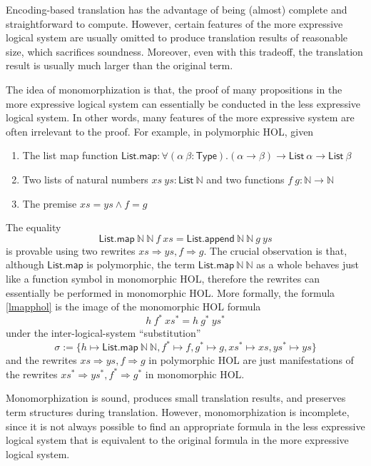   Encoding-based translation has the advantage of being (almost) complete
  and straightforward to compute. However, certain features of the more expressive
  logical system are usually omitted to produce translation results of reasonable size,
  which sacrifices soundness. Moreover, even with this tradeoff, the translation result is usually much larger
  than the original term.

  The idea of monomorphization is that, the proof of many propositions in the more expressive logical
  system can essentially be conducted in the less expressive logical system. In other words,
  many features of the more expressive system are often irrelevant to the proof. For example,
  in polymorphic HOL, given
  \begin{enumerate}
    \item The list map function $\mathsf{List.map} : \forall (\alpha \ \beta : \mathsf{Type}). (\alpha \to \beta) \to \mathsf{List} \ \alpha \to \mathsf{List} \ \beta$
    \item Two lists of natural numbers $xs \ ys : \mathsf{List} \ \mathbb{N}$ and two functions $f \ g : \mathbb{N} \to \mathbb{N}$
    \item The premise $xs = ys \land f = g$
  \end{enumerate}
  The equality
  \begin{equation}\label{lmapphol}
    \mathsf{List.map} \ \mathbb{N} \ \mathbb{N} \ f \ xs = \mathsf{List.append} \ \mathbb{N} \ \mathbb{N} \ g \ ys
  \end{equation}
  is provable using two rewrites $xs \Rightarrow ys, f \Rightarrow g$. The crucial observation is that, although $\textsf{List.map}$ is polymorphic, the term
  $\mathsf{List.map} \ \mathbb{N} \ \mathbb{N}$ as a whole behaves just like a function symbol in monomorphic HOL,
  therefore the rewrites can essentially be performed in monomorphic HOL. More formally,
  the formula \eqref{lmapphol} is the image of the monomorphic HOL formula
  $$h \ f^* \ xs^* = h \ g^* \ ys^*$$
  under the inter-logical-system ``substitution''
  $$\sigma := \{h \mapsto \mathsf{List.map} \ \mathbb{N} \ \mathbb{N},
    f^* \mapsto f, g^* \mapsto g, xs^* \mapsto xs, ys^* \mapsto ys\}$$
  and the rewrites $xs \Rightarrow ys, f \Rightarrow g$ in polymorphic HOL are just manifestations of the
  rewrites $xs^* \Rightarrow ys^*, f^* \Rightarrow g^*$ in monomorphic HOL.
  
  Monomorphization is sound, produces small translation results, and preserves
  term structures during translation. However, monomorphization is incomplete,
  since it is not always possible to find an appropriate formula in the less
  expressive logical system that is equivalent to the original formula
  in the more expressive logical system.

